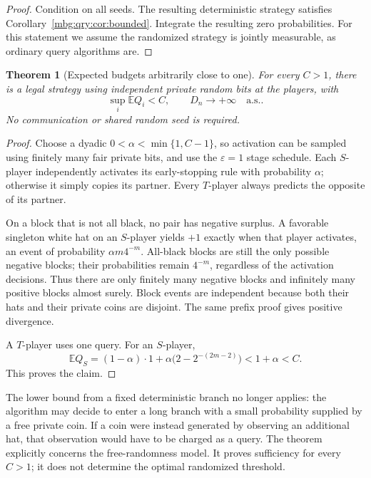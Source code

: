 \documentclass[11pt,letterpaper]{article}
\newtheorem{theorem}{Theorem}[section]
\theoremstyle{definition}
\newcommand{\E}{\mathbb E}
\newcommand{\as}{\text{a.s.}}
\begin{document}
\begin{proof}
Condition on all seeds. The resulting deterministic strategy satisfies
Corollary~\ref{mbg:qry:cor:bounded}. Integrate the resulting zero probabilities.
For this statement we assume the randomized strategy is jointly
measurable, as ordinary query algorithms are.
\end{proof}

\begin{theorem}[Expected budgets arbitrarily close to one]
\label{mbg:qry:thm:randomcost}
For every \(C>1\), there is a legal strategy using independent private
random bits at the players, with
\[
 \sup_i\E Q_i<C,\qquad D_n\to+\infty\quad\as.
\]
No communication or shared random seed is required.
\end{theorem}

\begin{proof}
Choose a dyadic \(0<\alpha<\min\{1,C-1\}\), so activation can be
sampled using finitely many fair private bits, and use the
\(\varepsilon=1\) stage schedule. Each \(S\)-player independently
activates its early-stopping rule with probability \(\alpha\);
otherwise it simply copies its partner. Every \(T\)-player always
predicts the opposite of its partner.

On a block that is not all black, no pair has negative surplus.
A favorable singleton white hat on an \(S\)-player yields \(+1\)
exactly when that player activates, an event of probability
\(\alpha m4^{-m}\). All-black blocks are still the only possible
negative blocks; their probabilities remain \(4^{-m}\), regardless
of the activation decisions.
Thus there are only finitely many negative blocks and infinitely
many positive blocks almost surely. Block events are independent
because both their hats and their private coins are disjoint.
The same prefix proof gives positive divergence.

A \(T\)-player uses one query. For an \(S\)-player,
\[
 \E Q_S=(1-\alpha)\cdot1+
 \alpha\bigl(2-2^{-(2m-2)}\bigr)<1+\alpha<C.
\]
This proves the claim.
\end{proof}

The lower bound from a fixed deterministic branch no longer applies:
the algorithm may decide to enter a long branch with a small probability
supplied by a free private coin. If a coin were instead generated by
observing an additional hat, that observation would have to be charged
as a query. The theorem explicitly concerns the free-randomness model.
It proves sufficiency for every \(C>1\); it does not determine the
optimal randomized threshold.
\end{document}
